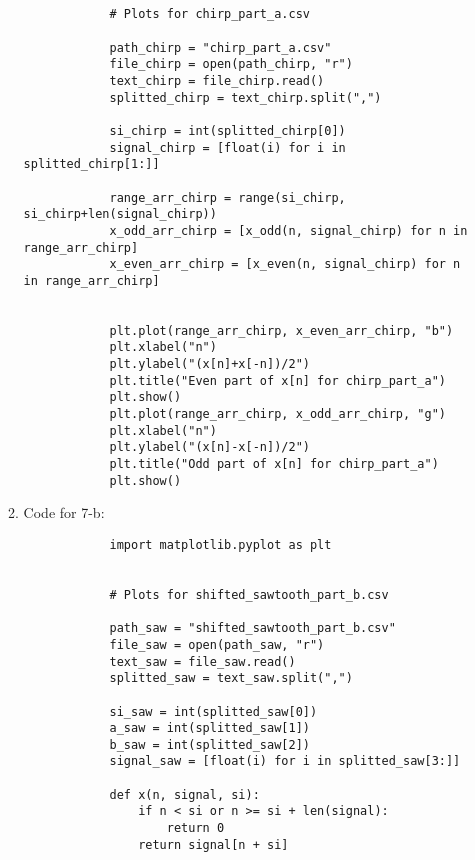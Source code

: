 \documentclass[10pt,a4paper, margin=1in]{article}
\begin{document}
\begin{enumerate}
\begin{enumerate}
\begin{verbatim}
            
            
            # Plots for chirp_part_a.csv
            
            path_chirp = "chirp_part_a.csv"
            file_chirp = open(path_chirp, "r")
            text_chirp = file_chirp.read()
            splitted_chirp = text_chirp.split(",")
            
            si_chirp = int(splitted_chirp[0])
            signal_chirp = [float(i) for i in splitted_chirp[1:]]
            
            range_arr_chirp = range(si_chirp, si_chirp+len(signal_chirp))
            x_odd_arr_chirp = [x_odd(n, signal_chirp) for n in range_arr_chirp]
            x_even_arr_chirp = [x_even(n, signal_chirp) for n in range_arr_chirp]
            
            
            plt.plot(range_arr_chirp, x_even_arr_chirp, "b")
            plt.xlabel("n")
            plt.ylabel("(x[n]+x[-n])/2")
            plt.title("Even part of x[n] for chirp_part_a")
            plt.show()
            plt.plot(range_arr_chirp, x_odd_arr_chirp, "g")
            plt.xlabel("n")
            plt.ylabel("(x[n]-x[-n])/2")
            plt.title("Odd part of x[n] for chirp_part_a")
            plt.show()
        \end{verbatim}
        \vspace*{3cm}

        
        \item %
        
        
        

        Code for 7-b:\\
        \begin{verbatim}
            import matplotlib.pyplot as plt

            
            # Plots for shifted_sawtooth_part_b.csv
            
            path_saw = "shifted_sawtooth_part_b.csv" 
            file_saw = open(path_saw, "r")
            text_saw = file_saw.read()
            splitted_saw = text_saw.split(",")
            
            si_saw = int(splitted_saw[0])
            a_saw = int(splitted_saw[1])
            b_saw = int(splitted_saw[2])
            signal_saw = [float(i) for i in splitted_saw[3:]]
            
            def x(n, signal, si):
                if n < si or n >= si + len(signal):
                    return 0
                return signal[n + si]
            

\end{verbatim}
\end{enumerate}
\end{enumerate}
\end{document}
